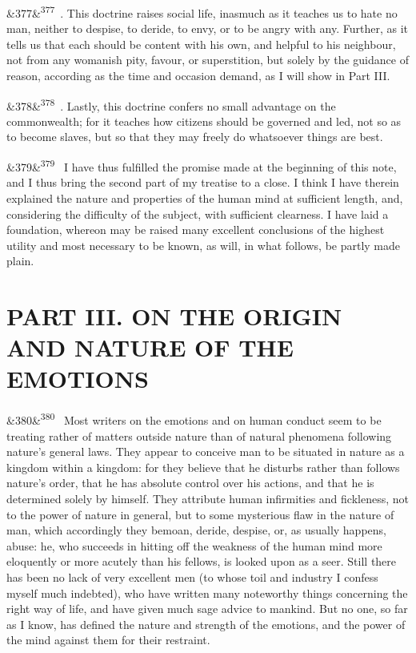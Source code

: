 \documentclass[12pt]{article}
\newcommand{\para}[1][]{\par\noindent\ifx&#1&\else\textsuperscript{\footnotesize #1}~\fi}
\begin{document}
\para[377] 3. This doctrine raises social life, inasmuch as it teaches us to hate no man, neither to despise, to deride, to envy, or to be angry with any. Further, as it tells us that each should be content with his own, and helpful to his neighbour, not from any womanish pity, favour, or superstition, but solely by the guidance of reason, according as the time and occasion demand, as I will show in Part III.

\para[378] 4. Lastly, this doctrine confers no small advantage on the commonwealth; for it teaches how citizens should be governed and led, not so as to become slaves, but so that they may freely do whatsoever things are best.

\para[379] I have thus fulfilled the promise made at the beginning of this note, and I thus bring the second part of my treatise to a close. I think I have therein explained the nature and properties of the human mind at sufficient length, and, considering the difficulty of the subject, with sufficient clearness. I have laid a foundation, whereon may be raised many excellent conclusions of the highest utility and most necessary to be known, as will, in what follows, be partly made plain.

\section*{PART III. ON THE ORIGIN AND NATURE OF THE EMOTIONS}

\para[380] Most writers on the emotions and on human conduct seem to be treating rather of matters outside nature than of natural phenomena following nature's general laws. They appear to conceive man to be situated in nature as a kingdom within a kingdom: for they believe that he disturbs rather than follows nature's order, that he has absolute control over his actions, and that he is determined solely by himself. They attribute human infirmities and fickleness, not to the power of nature in general, but to some mysterious flaw in the nature of man, which accordingly they bemoan, deride, despise, or, as usually happens, abuse: he, who succeeds in hitting off the weakness of the human mind more eloquently or more acutely than his fellows, is looked upon as a seer. Still there has been no lack of very excellent men (to whose toil and industry I confess myself much indebted), who have written many noteworthy things concerning the right way of life, and have given much sage advice to mankind. But no one, so far as I know, has defined the nature and strength of the emotions, and the power of the mind against them for their restraint.
\end{document}
